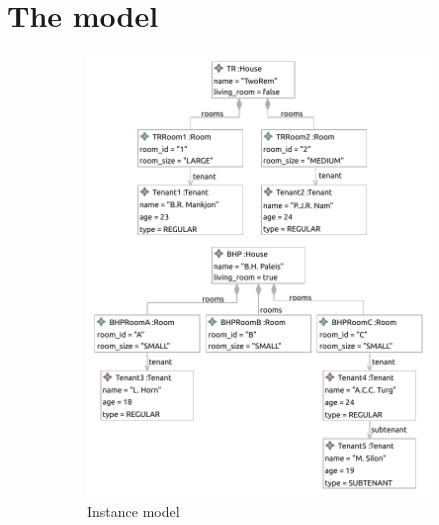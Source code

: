\section{The model}
\label{sec:application:the_model}

\begin{figure}[p]
    \centering
    \begin{subfigure}{0.98\textwidth}
        \centering
        \includegraphics{images/06_application/instance_model/step15.pdf}
        \caption{Instance model}
        \label{fig:application:the_model:final_ecore_model:instance_model}
    \end{subfigure}
    \\
    \begin{subfigure}{0.98\textwidth}
        \centering

\end{subfigure}
\end{figure}
